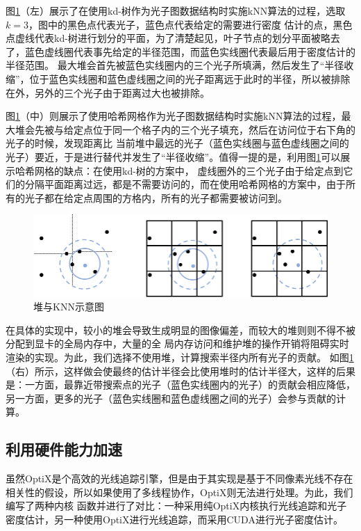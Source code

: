 \documentclass[UTF8]{ctexart}
\begin{document}
        图\ref{fig:6}（左）展示了在使用kd-树作为光子图数据结构时实施kNN算法的过程，选取$k=3$，图中的黑色点代表光子，蓝色点代表给定的需要进行密度
        估计的点，黑色点虚线代表kd-树进行划分的平面，为了清楚起见，叶子节点的划分平面被略去了，蓝色虚线圈代表事先给定的半径范围，而蓝色实线圈代表最后用于密度估计的半径范围。
        最大堆会首先被蓝色实线圈内的三个光子所填满，然后发生了“半径收缩”，位于蓝色实线圈和蓝色虚线圈之间的光子距离远于此时的半径，所以被排除在外，另外的三个光子由于距离过大也被排除。

        图\ref{fig:6}（中）则展示了使用哈希网格作为光子图数据结构时实施kNN算法的过程，最大堆会先被与给定点位于同一个格子内的三个光子填充，然后在访问位于右下角的光子的时候，发现距离比
        当前堆中最远的光子（蓝色实线圈与蓝色虚线圈之间的光子）要近，于是进行替代并发生了“半径收缩”。值得一提的是，利用图\ref{fig:6}可以展示哈希网格的缺点：在使用kd-树的方案中，
        虚线圈外的三个光子由于给定点到它们的分隔平面距离过远，都是不需要访问的，而在使用哈希网格的方案中，由于所有的光子都在给定点周围的方格内，所有的光子都需要被访问到。

        \begin{figure}[htbp]
        \centering
        \includegraphics[scale=0.8]{pic/KNN.png}
        \caption{堆与KNN示意图}
        \label{fig:6}
        \end{figure}

        在具体的实现中，较小的堆会导致生成明显的图像偏差，而较大的堆则则不得不被分配到显卡的全局内存中，大量的全
        局内存访问和维护堆的操作开销将阻碍实时渲染的实现。为此，我们选择不使用堆，计算搜索半径内所有光子的贡献。
        如图\ref{fig:6}（右）所示，这样做会使最终的估计半径会比使用堆时的估计半径大，这样的后果是：一方面，最靠近带搜索点的光子（蓝色实线圈内的光子）的贡献会相应降低，
        另一方面，更多的光子（蓝色实线圈和蓝色虚线圈之间的光子）会参与贡献的计算。

    \subsection{利用硬件能力加速}
        虽然OptiX是个高效的光线追踪引擎，但是由于其实现是基于不同像素光线不存在相关性的假设，所以如果使用了多线程协作，OptiX则无法进行处理。为此，我们编写了两种内核
        函数并进行了对比：一种采用纯OptiX内核执行光线追踪和光子密度估计，另一种使用OptiX进行光线追踪，而采用CUDA进行光子密度估计。
        
\end{document}
